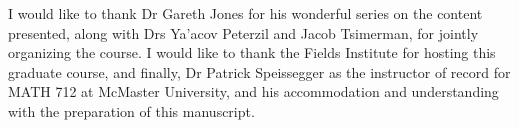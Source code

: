 %
%


I would like to thank Dr Gareth Jones for his wonderful series on the content presented, along with Drs Ya'acov Peterzil and Jacob Tsimerman, for jointly organizing the course. I would like to thank the Fields Institute for hosting this graduate course, and finally, Dr Patrick Speissegger as the instructor of record for MATH 712 at McMaster University, and his accommodation and understanding with the preparation of this manuscript.
